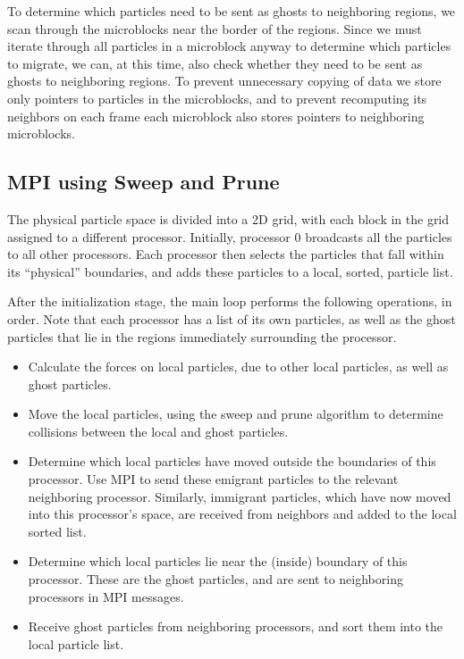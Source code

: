 \documentclass[11pt]{article} %
\begin{document}
To determine which particles need to be sent as ghosts to neighboring regions, we scan through the microblocks near the border of the regions. Since we must iterate through all particles in a microblock anyway to determine which particles to migrate, we can, at this time, also check whether they need to be sent as ghosts to neighboring regions. To prevent unnecessary copying of data we store only pointers to particles in the microblocks, and to prevent recomputing its neighbors on each frame each microblock also stores pointers to neighboring microblocks.

\subsection{MPI using Sweep and Prune}

The physical particle space is divided into a 2D grid, with each block in the grid assigned to a different processor. Initially, processor 0 broadcasts all the particles to all other processors. Each processor then selects the particles that fall within its ``physical'' boundaries, and adds these particles to a local, sorted, particle list.

After the initialization stage, the main loop performs the following operations, in order. Note that each processor has a list of its own particles, as well as the ghost particles that lie in the regions immediately surrounding the processor.
\begin{itemize}
\item Calculate the forces on local particles, due to other local particles, as well as ghost particles.
\item Move the local particles, using the sweep and prune algorithm to determine collisions between the local and ghost particles.
\item Determine which local particles have moved outside the boundaries of this processor. Use MPI to send these emigrant particles to the relevant neighboring processor. Similarly, immigrant particles, which have now moved into this processor's space, are received from neighbors and added to the local sorted list.
\item Determine which local particles lie near the (inside) boundary of this processor. These are the ghost particles, and are sent to neighboring processors in MPI messages.
\item Receive ghost particles from neighboring processors, and sort them into the local particle list.
\end{itemize}
\end{document}
